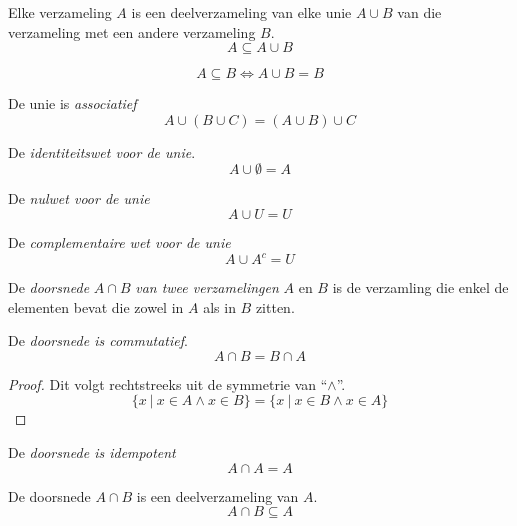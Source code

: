 \documentclass[main.tex]{subfiles}
\begin{document}
\begin{st}
  Elke verzameling $A$ is een deelverzameling van elke unie $A \cup B$ van die verzameling met een andere verzameling $B$.
  \[ A \subseteq A \cup B \]
\end{st}

\begin{st}
  \[ A \subseteq B \Leftrightarrow A \cup B = B \]
\end{st}

\begin{st}
  De unie is \emph{associatief}
  \[ A \cup (B \cup C) = (A \cup B) \cup C \]
\end{st}

\begin{st}
  De \emph{identiteitswet voor de unie}.
  \[ A \cup \emptyset = A \]
\end{st}

\begin{st}
  De \emph{nulwet voor de unie}
  \[ A \cup U = U \]
\end{st}

\begin{st}
  De \emph{complementaire wet voor de unie}
  \[ A \cup A^{c} = U \]
\end{st}

\begin{de}
  De \emph{doorsnede} $A \cap B$ \emph{van twee verzamelingen} $A$ en $B$ is de verzamling die enkel de elementen bevat die zowel in $A$ als in $B$ zitten.
\end{de}

\begin{ei}
  De \emph{doorsnede is commutatief}.
  \[ A \cap B = B \cap A \]
  \begin{proof}
    Dit volgt rechtstreeks uit de symmetrie van ``$\wedge$''.
    \[ \{ x\ |\ x \in A \wedge x \in B\} = \{ x\ |\ x \in B \wedge x \in A\} \]
  \end{proof}
\end{ei}

\begin{ei}
  De \emph{doorsnede is idempotent}
  \[ A \cap A = A \]
\end{ei} 

\begin{st}
  De doorsnede $A \cap B$ is een deelverzameling van $A$.
  \[ A \cap B \subseteq A \]
\end{st}
\end{document}
